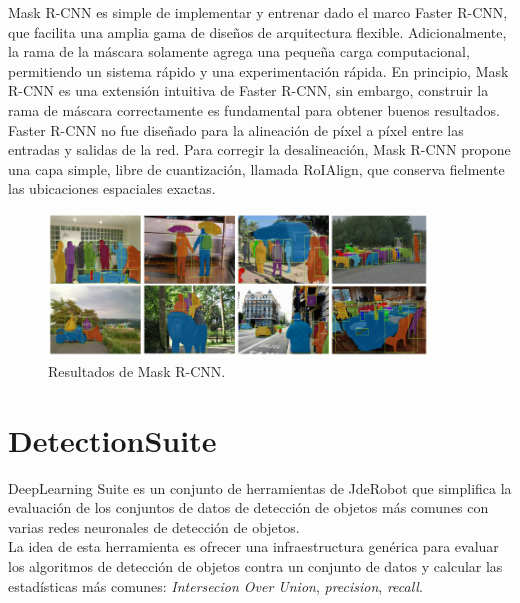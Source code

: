 \documentclass{bmvc2k}
\begin{document}
Mask R-CNN es simple de implementar y entrenar dado el marco Faster R-CNN, que facilita una amplia gama de diseños de arquitectura flexible. Adicionalmente, la rama de la máscara solamente agrega una pequeña carga computacional, permitiendo un sistema rápido y una experimentación rápida. En principio, Mask R-CNN es una extensión intuitiva de Faster R-CNN, sin embargo, construir la rama de máscara correctamente es fundamental para obtener buenos resultados.\\

Faster R-CNN no fue diseñado para la alineación de píxel a píxel entre las entradas y salidas de la red. Para corregir la desalineación, Mask R-CNN propone una capa simple, libre de cuantización, llamada RoIAlign, que conserva fielmente las ubicaciones espaciales exactas.\\

\begin{figure}
\begin{center}
	\includegraphics[width=0.9\textwidth]{images/maskRcnn.png}
   \caption{Resultados de Mask R-CNN.}
	\label{fig.maskRcnn}
\end{center}
\end{figure}


\section{DetectionSuite}

DeepLearning Suite es un conjunto de herramientas de JdeRobot que simplifica la evaluación de los conjuntos de datos de detección de objetos más comunes con varias redes neuronales de detección de objetos.\\

La idea de esta herramienta es ofrecer una infraestructura genérica para evaluar los algoritmos de detección de objetos contra un conjunto de datos y calcular las estadísticas más comunes: \textit{Intersecion Over Union}, \textit{precision}, \textit{recall}.\\
\end{document}
